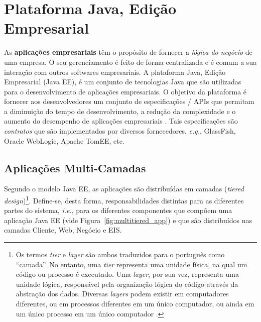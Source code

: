 \documentclass[
  10.5pt,				  %
	openright,			%
	twoside,			  %
  a5paper,
  chapter=TITLE,	%
	section=TITLE,	%
  hyphens,        %
	english,        %
	brazil          %
]{abntex2}
\begin{document}


\section{Plataforma Java, Edição Empresarial}\label{sec:java2e}

As \textbf{aplicações empresariais} têm o propósito de fornecer a \emph{lógica do negócio} de uma empresa. O seu gerenciamento é feito de forma centralizada e é comum a sua interação com outros softwares empresariais. A plataforma Java, Edição Empresarial (Java EE), é um conjunto de tecnologias Java que são utilizadas para o desenvolvimento de aplicações empresariais. O objetivo da plataforma é fornecer aos desenvolvedores um conjunto de especificações / APIs que permitam a diminuição do tempo de desenvolvimento, a redução da complexidade e o aumento do desempenho de aplicações empresariais \cite{javaee7}. Tais especificações são \emph{contratos} que são implementados por diversos fornecedores, \emph{e.g.}, GlassFish, Oracle WebLogic, Apache TomEE, etc.

\subsection{Aplicações Multi-Camadas}

Segundo o modelo Java EE, as aplicações são distribuídas em camadas (\emph{tiered design})\footnote{Os termos \emph{tier} e \emph{layer} são ambos traduzidos para o português como ``camada''. No entanto, uma \emph{tier} representa uma unidade física, na qual um código ou processo é executado. Uma \emph{layer}, por sua vez, representa uma unidade lógica, responsável pela organização lógica do código através da abstração dos dados. Diversas \emph{layers} podem existir em computadores diferentes, ou em processos diferentes em um único computador, ou ainda em um único processo em um único computador \cite{lhotka}.}. Define-se, desta forma, responsabilidades distintas para as diferentes partes do sistema, \emph{i.e.}, para os diferentes componentes que compõem uma aplicação Java EE (vide Figura~\ref{fig:multitiered_app}) e que são distribuídos nas camadas Cliente, Web, Negócio e EIS.
\end{document}
